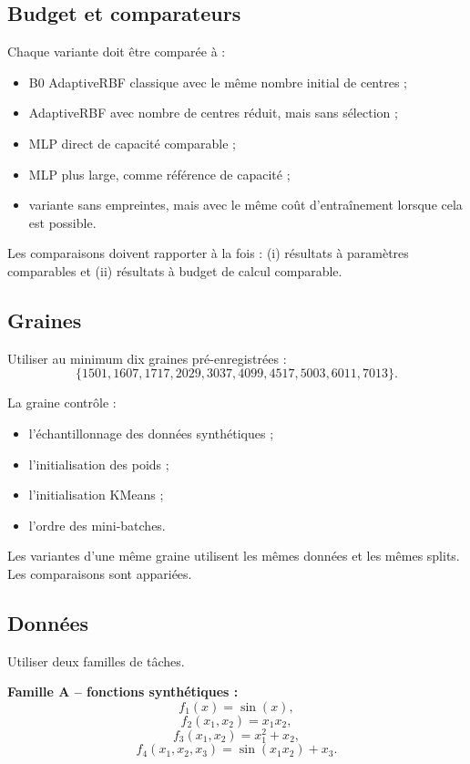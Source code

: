 \documentclass[11pt,a4paper]{article}
\begin{document}
\subsection{Budget et comparateurs}

Chaque variante doit être comparée à :

\begin{itemize}
  \item B0 AdaptiveRBF classique avec le même nombre initial de centres ;
  \item AdaptiveRBF avec nombre de centres réduit, mais sans sélection ;
  \item MLP direct de capacité comparable ;
  \item MLP plus large, comme référence de capacité ;
  \item variante sans empreintes, mais avec le même coût d'entraînement
  lorsque cela est possible.
\end{itemize}

Les comparaisons doivent rapporter à la fois :
(i) résultats à paramètres comparables et
(ii) résultats à budget de calcul comparable.

\subsection{Graines}

Utiliser au minimum dix graines pré-enregistrées :
\[
\{1501,1607,1717,2029,3037,4099,4517,5003,6011,7013\}.
\]

La graine contrôle :
\begin{itemize}
  \item l'échantillonnage des données synthétiques ;
  \item l'initialisation des poids ;
  \item l'initialisation KMeans ;
  \item l'ordre des mini-batches.
\end{itemize}

Les variantes d'une même graine utilisent les mêmes données et les
mêmes splits. Les comparaisons sont appariées.

\subsection{Données}

Utiliser deux familles de tâches.

\textbf{Famille A -- fonctions synthétiques :}
\[
f_1(x)=\sin(x),
\]
\[
f_2(x_1,x_2)=x_1x_2,
\]
\[
f_3(x_1,x_2)=x_1^2+x_2,
\]
\[
f_4(x_1,x_2,x_3)=\sin(x_1x_2)+x_3.
\]
\end{document}
